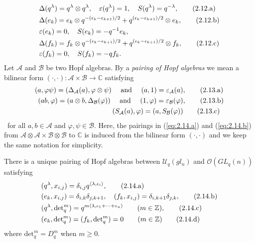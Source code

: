 \documentclass[table,a4paper,reqno]{amsart}
\numberwithin{equation}{section}
\theoremstyle{definition}
\begin{document}
\begin{align}\stepcounter{equation}
    &\Delta(q^\lambda)=q^\lambda\otimes q^\lambda,\quad \varepsilon(q^\lambda)=1,\quad S(q^\lambda)=q^{-\lambda},\tag{2.12.a}\label{eq:2.13.a}\\
    &\Delta(e_k)=e_k\otimes q^{-(\epsilon_k-\epsilon_{k+1})/2}+q^{(\epsilon_k-\epsilon_{k+1})/2}\otimes e_k,\tag{2.12.b}\label{eq:2.13.b}\\
    &\varepsilon(e_k)=0,\quad S(e_k)=-q^{-1}e_k,\notag\\
    &\Delta(f_k)=f_k\otimes q^{-(\epsilon_k-\epsilon_{k+1})/2}+q^{(\epsilon_k-\epsilon_{k+1})/2}\otimes f_k,\tag{2.12.c}\label{eq:2.13.c}\\
    &\varepsilon(f_k)=0,\quad S(f_k)=-qf_k.\notag
\end{align}
Let $\mathcal{A}$ and $\mathcal{B}$ be two Hopf algebras. By a \textit{pairing of Hopf algebras} we mean a bilinear form $(\cdot,\cdot):\mathcal{A}\times \mathcal{B}\rightarrow\mathbb{C}$ satisfying
\begin{align}\stepcounter{equation}
    (a,\varphi\psi)=(\Delta_\mathcal{A}(a),\varphi\otimes\psi)\quad\text{ and }\quad(a,1)=\varepsilon_\mathcal{A}(a)&,\tag{2.13.a}\label{eq:2.14.a}\\
    (ab,\varphi)=(a\otimes b,\Delta_\mathcal{B}(\varphi))\quad\text{ and }\quad(1,\varphi)=\varepsilon_\mathcal{B}(\varphi)&,\tag{2.13.b}\label{eq:2.14.b}\\
    (S_\mathcal{A}(a),\varphi)=(a,S_\mathcal{B}(\varphi))&\tag{2.13.c}\label{eq:2.14.c}
\end{align}\
for all $a,b\in \mathcal{A}$ and $\varphi,\psi\in \mathcal{B}$. Here, the pairings in (\ref{eq:2.14.a}) and (\ref{eq:2.14.b}) from $\mathcal{A}\otimes\mathcal{A}\times\mathcal{B}\otimes\mathcal{B}$ to $\mathbb{C}$ is induced from the bilinear form $(\cdot,\cdot)$ and we keep the same notation for simplicity.

There is a unique pairing of Hopf algebras between $\mathcal{U}_q(gl_n)$ and $\mathcal{O}(GL_q(n))$ satisfying
\begin{align}\stepcounter{equation}
    &(q^\lambda,x_{i,j})=\delta_{i,j}q^{\langle\lambda,\epsilon_i\rangle},\tag{2.14.a}\label{eq:2.15.a}\\
    &(e_k,x_{i,j})=\delta_{i,k}\delta_{j,k+1},\quad (f_k,x_{i,j})=\delta_{i,k+1}\delta_{j,k},\tag{2.14.b}\label{eq:2.15.b}\\
    &(q^\lambda,\text{det}_q^m)=q^{m\langle\lambda,\epsilon_1+\cdots+\epsilon_n\rangle}\quad\quad (m\in\mathbb{Z}),\tag{2.14.c}\label{eq:2.15.c}\\
    &(e_k,\text{det}_q^m)=(f_k,\text{det}_q^m)=0\quad\quad (m\in\mathbb{Z})\tag{2.14.d}\label{eq:2.15.d}
\end{align}
where $\text{det}_q^m=D_q^m$ when $m\ge 0$. 
\end{document}
